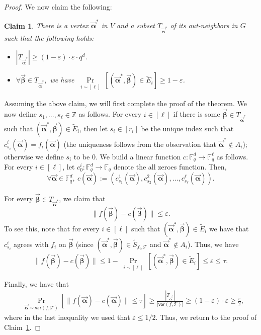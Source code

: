 \documentclass[10pt,a4paper]{article}
\newcommand{\F}{\mathbb{F}}
\renewcommand{\ge}{ \geqslant}
\renewcommand{\le}{ \leqslant}
\newtheorem{claim}[theorem]{Claim}
\newcommand{\alphab}{\vec{\bm{\alpha}}}
\newcommand{\betab}{\vec{\bm{\beta}}}
\newcommand{\var}{\mathsf{var}}
\renewcommand{\tilde}{\widetilde}
\renewcommand{\kappa}{\tau}
\begin{document}
\begin{proof}
	We now claim the following:
	
	\begin{claim}\label{claimTh3.2}
		There is a vertex $\alphab^*$ in $V$ and a subset $T_{\alphab^*}$ of its out-neighbors in $G$ such that the following holds:
		\begin{itemize}
\item $|T_{\alphab^*}|\ge (1-\varepsilon)\cdot \varepsilon\cdot q^d$. 
\item $\forall \betab\in T_{\alphab^*},$ we have $\underset{\substack{i\sim [\ell]}}{\Pr}\left[\left(\alphab^*,\betab\right)\in \tilde E_i\right]\ge 1-\varepsilon$.
		\end{itemize}
	\end{claim}
	
	Assuming the above claim, we will first complete the proof of the theorem. We now define $s_1,\ldots ,s_{\ell}\in \mathbb{Z}$ as follows. For every  $i\in [\ell]$ if there is some $\betab \in T_{\alphab^*}$ such that $(\alphab^*,\betab)\in \tilde E_i$, then let $s_i\in [r_i]$ be the unique index such that $c_{s_i}^i(\alphab)= f_i(\alphab)$ (the uniqueness follows from the observation that $\alphab^*\notin A_i$); otherwise we define $s_i$ to be 0.
	We build a linear function $c:\F_q^d\to\F_q^\ell$ as follows. For every $i\in [\ell]$, let $c_0^i:\F_q^d\to\F_q$ denote the all zeroes function. Then,
	$$ \forall \alphab\in \F_q^d,\ 
	c(\alphab):=\left(c_{s_1}^1(\alphab),c_{s_2}^2(\alphab),\ldots ,c_{s_{\ell}}^\ell(\alphab)\right).
	$$
	
	
	
	For every $\betab\in T_{\alphab^\ast}$, we claim that $$
	\|f(\betab)-c(\betab)\|\le \varepsilon.
	$$
	To see this, note that for every $i\in[\ell]$ such that $(\alphab^*,\betab)\in\tilde E_i$ we have that $c_{s_i}^i$ agrees with $f_i$ on $\betab$ (since $(\alphab^*,\betab)\in\tilde S_{f_i,\mathcal{T}}$ and $\alphab^*\notin A_i$). Thus, we have 
	$$
	\|f(\betab)-c(\betab)\|\le 1-\underset{\substack{i\sim [\ell]}}{\Pr}\left[\left(\alphab^*,\betab\right)\in \tilde E_i\right]\le \varepsilon \le \tau.
	$$
	
	Finally, we have that 
	\begin{align*}
		&
		\underset{\alphab\sim \var(f,\mathcal{T}) }{\Pr}\left[\|f(\alphab)-c(\alphab)\|\le \kappa \right]\ge \frac{|T_{\alphab^\ast}|}{|\var(f,\mathcal{T})|}\ge (1-\varepsilon)\cdot \varepsilon\ge \frac{\varepsilon}{2},
	\end{align*}
where in the last inequality we used that $\varepsilon\le 1/2$.	Thus, we return to the proof of Claim~\ref{claimTh3.2}.
	

\end{proof}
\end{document}
